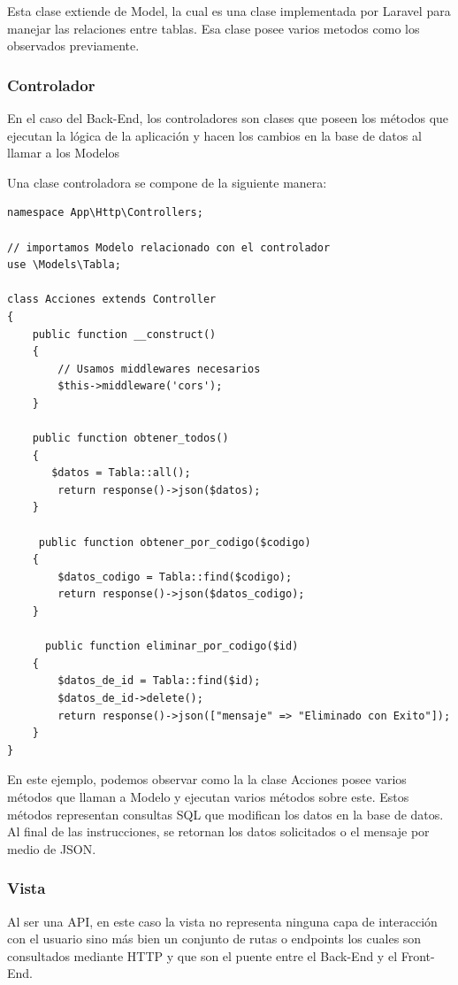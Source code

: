 Esta clase extiende de Model, la cual es una clase implementada por Laravel para manejar las relaciones entre tablas. Esa clase posee varios metodos como los observados previamente.

\subsubsection{Controlador}
En el caso del Back-End, los controladores son clases que poseen los métodos que ejecutan la lógica de la aplicación y hacen los cambios en la base de datos al llamar a los Modelos

Una clase controladora se compone de la siguiente manera:

\begin{lstlisting}
namespace App\Http\Controllers;

// importamos Modelo relacionado con el controlador
use \Models\Tabla;

class Acciones extends Controller
{
    public function __construct()
    {
        // Usamos middlewares necesarios
        $this->middleware('cors');
    }

    public function obtener_todos()
    {
       $datos = Tabla::all();
        return response()->json($datos);
    }
    
     public function obtener_por_codigo($codigo)
    {
        $datos_codigo = Tabla::find($codigo);
        return response()->json($datos_codigo);
    }
    
      public function eliminar_por_codigo($id)
    {
        $datos_de_id = Tabla::find($id);
        $datos_de_id->delete();
        return response()->json(["mensaje" => "Eliminado con Exito"]);
    }
}
\end{lstlisting}

En este ejemplo, podemos observar como la la clase Acciones posee varios métodos que llaman a Modelo y ejecutan varios métodos sobre este. Estos métodos representan consultas SQL que modifican los datos en la base de datos.
Al final de las instrucciones, se retornan los datos solicitados o el mensaje por medio de JSON.

\subsubsection{Vista}
Al ser una API, en este caso la vista no representa ninguna capa de interacción con el usuario sino más bien un conjunto de rutas o endpoints los cuales son consultados mediante HTTP y que son el puente entre el Back-End y el Front-End.

